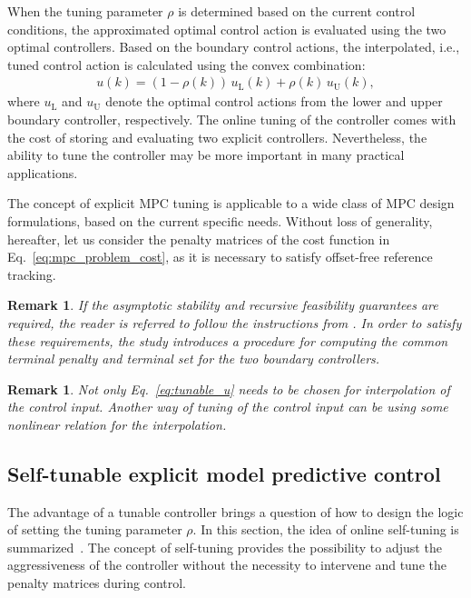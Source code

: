 \documentclass[preprint,12pt]{elsarticle}
\newtheorem{remark}[theorem]{Remark}
\begin{document}
	When the tuning parameter $\rho$ is determined based on the current control conditions, the approximated optimal control action is evaluated using the two optimal controllers. Based on the boundary control actions, the interpolated, i.e., tuned control action is calculated using the convex combination:
		\begin{eqnarray}
			\label{eq:tunable_u}
			u(k) = (1-\rho(k)) \, u_\mathrm{L}(k) + \rho(k) \, u_\mathrm{U}(k),
		\end{eqnarray}
	where $u_\mathrm{L}$ and $u_\mathrm{U}$ denote the optimal control actions from the lower and upper boundary controller, respectively. The online tuning of the controller comes with the cost of storing and evaluating two explicit controllers. Nevertheless, the ability to tune the controller may be more important in many practical applications.
	
	The concept of explicit MPC tuning is applicable to a wide class of MPC design formulations, based on the current specific needs. Without loss of generality, hereafter, let us consider the penalty matrices of the cost function in Eq.~\eqref{eq:mpc_problem_cost}, as it is necessary to satisfy offset-free reference tracking.
	
	\begin{remark}
		If the asymptotic stability and recursive feasibility guarantees are required, the reader is referred to follow the instructions from \cite{Oravec_tunable}. In order to satisfy these requirements, the study introduces a procedure for computing the common terminal penalty and terminal set for the two boundary controllers. 
	\end{remark}
	
	\begin{remark}
		Not only Eq.~\eqref{eq:tunable_u} needs to be chosen for interpolation of the control input. Another way of tuning of the control input can be using some nonlinear relation for the interpolation. 
	\end{remark}
	
	
	
	\subsection{Self-tunable explicit model predictive control}
	\label{sec:self_tunable}	
	The advantage of a tunable controller brings a question of how to design the logic of setting the tuning parameter $\rho$. In this section, the idea of online self-tuning is summarized~\cite{self_tunable}. The concept of self-tuning provides the possibility to adjust the aggressiveness of the controller without the necessity to intervene and tune the penalty matrices during control. 
	
\end{document}
